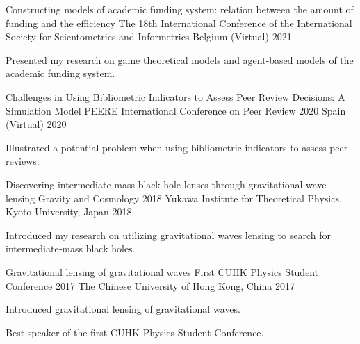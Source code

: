 \begin{cventries}
  \cventry
    {Constructing models of academic funding system: relation between the amount of funding and the efficiency} %
    {The 18th International Conference of the International Society for Scientometrics and Informetrics} %
    {Belgium (Virtual)} %
    {2021} %
    {
      \begin{cvitems} %
        \item {Presented my research on game theoretical models and agent-based models of the academic funding system.}
      \end{cvitems}
    }

  \cventry
    {Challenges in Using Bibliometric Indicators to Assess Peer Review Decisions: A Simulation Model} %
    {PEERE International Conference on Peer Review 2020} %
    {Spain (Virtual)} %
    {2020} %
    {
      \begin{cvitems} %
        \item {Illustrated a potential problem when using bibliometric indicators to assess peer reviews.}
      \end{cvitems}
    }

  \cventry
    {Discovering intermediate‑mass black hole lenses through gravitational wave lensing} %
    {Gravity and Cosmology 2018} %
    {Yukawa Institute for Theoretical Physics, Kyoto University, Japan} %
    {2018} %
    {
      \begin{cvitems} %
        \item {Introduced my research on utilizing gravitational waves lensing to search for intermediate‑mass black holes.}
      \end{cvitems}
    }

  \cventry
    {Gravitational lensing of gravitational waves} %
    {First CUHK Physics Student Conference 2017} %
    {The Chinese University of Hong Kong, China} %
    {2017} %
    {
      \begin{cvitems} %
        \item {Introduced gravitational lensing of gravitational waves.}
        \item {Best speaker of the first CUHK Physics Student Conference.}
      \end{cvitems}
    }

\end{cventries}
